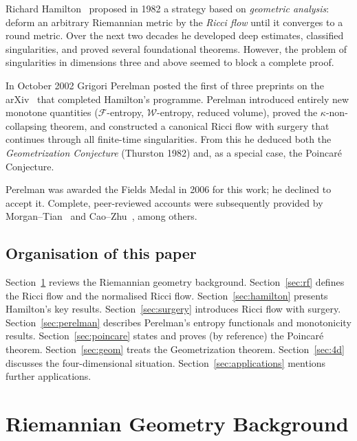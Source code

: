 \documentclass[12pt,a4paper]{amsart}
\theoremstyle{definition}
\theoremstyle{remark}
\begin{document}
Richard Hamilton~\cite{Hamilton1982} proposed in 1982 a strategy based on
\emph{geometric analysis}: deform an arbitrary Riemannian metric by the
\emph{Ricci flow} until it converges to a round metric.  Over the next two
decades he developed deep estimates, classified singularities, and proved
several foundational theorems.  However, the problem of singularities in
dimensions three and above seemed to block a complete proof.

In October 2002 Grigori Perelman posted the first of three preprints on the
arXiv~\cite{Perelman2002,Perelman2003a,Perelman2003b} that completed
Hamilton's programme.  Perelman introduced entirely new monotone quantities
($\mathcal{F}$-entropy, $\mathcal{W}$-entropy, reduced volume), proved the
$\kappa$-non-collapsing theorem, and constructed a canonical Ricci flow with
surgery that continues through all finite-time singularities.  From this he
deduced both the \emph{Geometrization Conjecture} (Thurston 1982) and, as a
special case, the Poincar\'{e} Conjecture.

Perelman was awarded the Fields Medal in 2006 for this work; he declined to
accept it.  Complete, peer-reviewed accounts were subsequently provided by
Morgan--Tian~\cite{MorganTian2007} and Cao--Zhu~\cite{CaoZhu2006}, among
others.

\subsection*{Organisation of this paper}
Section~\ref{sec:riem} reviews the Riemannian geometry background.
Section~\ref{sec:rf} defines the Ricci flow and the normalised Ricci flow.
Section~\ref{sec:hamilton} presents Hamilton's key results.
Section~\ref{sec:surgery} introduces Ricci flow with surgery.
Section~\ref{sec:perelman} describes Perelman's entropy functionals and
monotonicity results.
Section~\ref{sec:poincare} states and proves (by reference) the Poincar\'{e}
theorem.
Section~\ref{sec:geom} treats the Geometrization theorem.
Section~\ref{sec:4d} discusses the four-dimensional situation.
Section~\ref{sec:applications} mentions further applications.


\section{Riemannian Geometry Background}
\label{sec:riem}
\end{document}
